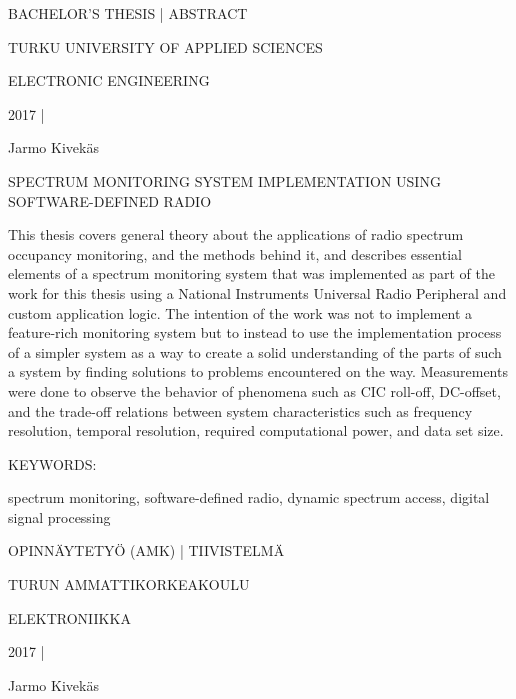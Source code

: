 BACHELOR'S THESIS | ABSTRACT

TURKU UNIVERSITY OF APPLIED SCIENCES

ELECTRONIC ENGINEERING

2017 | \pageref{LastPage}


\vspace{7mm}
{\Large Jarmo Kivekäs \par}

\vspace{7mm}
{\huge SPECTRUM MONITORING SYSTEM IMPLEMENTATION USING SOFTWARE-DEFINED RADIO \par}

\vspace{7mm}



This thesis covers general theory about the applications of radio spectrum occupancy
monitoring, and the methods behind it, and describes essential elements of a
spectrum monitoring system that was implemented as part of the work for this
thesis using a National Instruments Universal Radio Peripheral and custom
application logic. The intention of the work was not to implement a feature-rich
monitoring system but to instead to use the implementation process of a simpler
system as a way to create a solid understanding of the parts of such
a system by finding solutions to problems encountered on the way.
Measurements were done to observe the behavior of phenomena such as CIC roll-off,
DC-offset, and the trade-off relations between system characteristics such as
frequency resolution, temporal resolution, required computational power,
and data set size.



\vspace{25mm}

KEYWORDS:

spectrum monitoring, software-defined radio, dynamic spectrum access, digital signal processing



\clearpage


OPINNÄYTETYÖ (AMK) | TIIVISTELMÄ

TURUN AMMATTIKORKEAKOULU

ELEKTRONIIKKA

2017 | \pageref{LastPage}


\vspace{7mm}
{\Large Jarmo Kivekäs \par}

